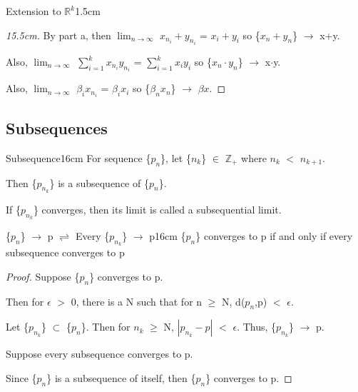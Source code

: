\begin{ltheorem}{Extension to $\mathbb{R}^k$}{1.5cm}
            \begin{proof}[15.5cm]
                By part a, then
                $\lim_{n \rightarrow \infty}$ $x_{n_i} + y_{n_i}$
                = $x_i + y_i$ so
                \{$x_n + y_n$\} $\rightarrow$ x+y.

                Also,
                $\lim_{n \rightarrow \infty}$ $\sum_{i=1}^k x_{n_i} y_{n_i}$
                = $\sum_{i=1}^k x_i y_i$ so
                \{$x_n \cdot y_n$\} $\rightarrow$ x$\cdot$y.

                Also,
                $\lim_{n \rightarrow \infty}$ $\beta_i x_{n_i}$
                = $\beta_i x_i$ so
                \{$\beta_n x_n$\} $\rightarrow$ $\beta x$.
            \end{proof}
    \end{ltheorem}

    \vspace{0.5cm}





\subsection{ Subsequences }

    \begin{definition}{Subsequence}{16cm}
        For sequence \{$p_n$\}, let \{$n_k$\} $\in$ $\mathbb{Z}_+$
        where $n_k$ $<$ $n_{k+1}$.

        Then \{$p_{n_k}$\} is a {\color{lblue} subsequence} of \{$p_n$\}.
        
        If \{$p_{n_k}$\} converges, then its limit is called
        a {\color{lblue} subsequential limit}.
    \end{definition}
    
    \vspace{0.5cm}



    \begin{wtheorem}{\{$p_n$\} $\rightarrow$ p $\rightleftharpoons$
    Every \{$p_{n_k}$\} $\rightarrow$ p}{16cm}
        \{$p_n$\} converges to p if and only if every subsequence
        converges to p
    \end{wtheorem}
    
    \begin{proof}
        Suppose \{$p_n$\} converges to p.

        Then for $\epsilon$ $>$ 0, there is a N such that for n $\geq$ N,
        d($p_n$,p) $<$ $\epsilon$.

        Let \{$p_{n_k}$\} $\subset$ \{$p_n$\}.
        Then for $n_k$ $\geq$ N, $|p_{n_k} - p|$ $<$ $\epsilon$.
        Thus, \{$p_{n_k}$\} $\rightarrow$ p.

        \vspace{0.2cm}

        Suppose every subsequence converges to p.

        Since \{$p_n$\} is a subsequence of itself, then
        \{$p_n$\} converges to p.
    \end{proof}



